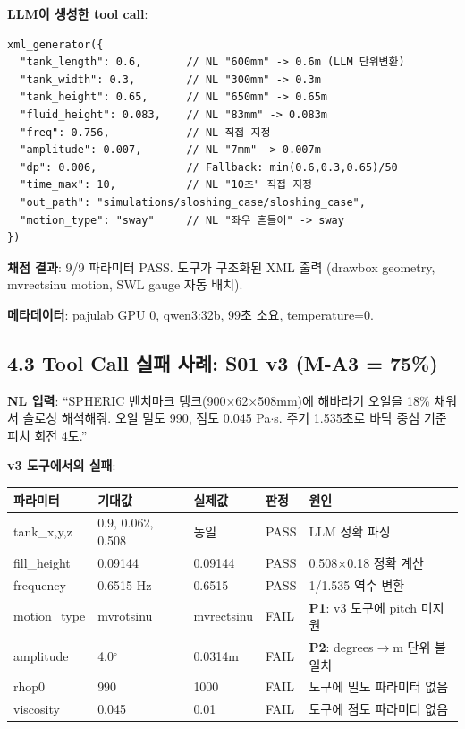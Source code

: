 \documentclass[10pt,a4paper]{article}
\begin{document}
\textbf{LLM이 생성한 tool call}:

\begin{lstlisting}
xml_generator({
  "tank_length": 0.6,       // NL "600mm" -> 0.6m (LLM 단위변환)
  "tank_width": 0.3,        // NL "300mm" -> 0.3m
  "tank_height": 0.65,      // NL "650mm" -> 0.65m
  "fluid_height": 0.083,    // NL "83mm" -> 0.083m
  "freq": 0.756,            // NL 직접 지정
  "amplitude": 0.007,       // NL "7mm" -> 0.007m
  "dp": 0.006,              // Fallback: min(0.6,0.3,0.65)/50
  "time_max": 10,           // NL "10초" 직접 지정
  "out_path": "simulations/sloshing_case/sloshing_case",
  "motion_type": "sway"     // NL "좌우 흔들어" -> sway
})
\end{lstlisting}

\textbf{채점 결과}: 9/9 파라미터 PASS. 도구가 구조화된 XML 출력 (drawbox geometry, mvrectsinu motion, SWL gauge 자동 배치).

\textbf{메타데이터}: pajulab GPU 0, qwen3:32b, 99초 소요, temperature=0.

\subsection{4.3 Tool Call 실패 사례: S01 v3 (M-A3 = 75\%)}

\textbf{NL 입력}: ``SPHERIC 벤치마크 탱크(900$\times$62$\times$508mm)에 해바라기 오일을 18\% 채워서 슬로싱 해석해줘. 오일 밀도 990, 점도 0.045 Pa$\cdot$s. 주기 1.535초로 바닥 중심 기준 피치 회전 4도.''

\textbf{v3 도구에서의 실패}:

\begin{center}
\small
\begin{tabular}{llllp{5cm}}
\toprule
\textbf{파라미터} & \textbf{기대값} & \textbf{실제값} & \textbf{판정} & \textbf{원인} \\
\midrule
tank\_x,y,z & 0.9, 0.062, 0.508 & 동일 & \textcolor{pass}{PASS} & LLM 정확 파싱 \\
fill\_height & 0.09144 & 0.09144 & \textcolor{pass}{PASS} & 0.508$\times$0.18 정확 계산 \\
frequency & 0.6515 Hz & 0.6515 & \textcolor{pass}{PASS} & 1/1.535 역수 변환 \\
motion\_type & mvrotsinu & mvrectsinu & \textcolor{fail}{FAIL} & \textbf{P1}: v3 도구에 pitch 미지원 \\
amplitude & 4.0$^\circ$ & 0.0314m & \textcolor{fail}{FAIL} & \textbf{P2}: degrees$\rightarrow$m 단위 불일치 \\
rhop0 & 990 & 1000 & \textcolor{fail}{FAIL} & 도구에 밀도 파라미터 없음 \\
viscosity & 0.045 & 0.01 & \textcolor{fail}{FAIL} & 도구에 점도 파라미터 없음 \\
\bottomrule
\end{tabular}
\end{center}
\end{document}

